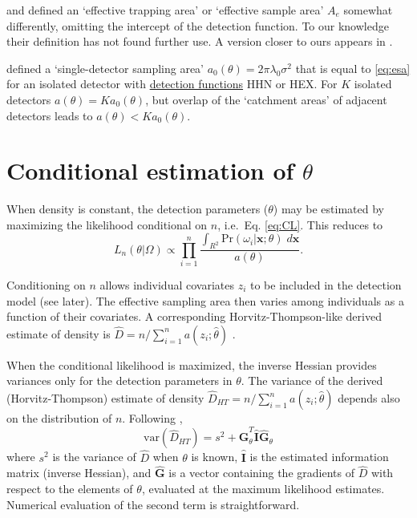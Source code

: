 \documentclass[
]{book}
\begin{document}
\citet{grw09} and \citet{rnug09} defined an `effective trapping area' or `effective sample area' \(A_e\) somewhat differently, omitting the intercept of the detection function. To our knowledge their definition has not found further use. A version closer to ours appears in \citet[Section 5.12]{rcsg14}.

\citet{em14} defined a `single-detector sampling area' \(a_0(\theta) = 2\pi \lambda_0 \sigma^2\) that is equal to \eqref{eq:esa} for an isolated detector with \hyperref[detectfn]{detection functions} HHN or HEX. For \(K\) isolated detectors \(a(\theta) = Ka_0(\theta)\), but overlap of the `catchment areas' of adjacent detectors leads to \(a(\theta) < Ka_0(\theta)\).

\section{\texorpdfstring{Conditional estimation of \(\theta\)}{Conditional estimation of \textbackslash theta}}\label{conditional}


When density is constant, the detection parameters (\(\theta\)) may be estimated by maximizing the likelihood conditional on \(n\), i.e.~Eq. \eqref{eq:CL}. This reduces to\\
\begin{equation}
L_n (\theta| \Omega) \propto \prod_{i=1}^n \frac{\int_{R^2} \mbox{Pr}(\omega_i | \mathbf{x}; \theta) \; d\mathbf{x}}{a(\theta)}.
\end{equation}

Conditioning on \(n\) allows individual covariates \(z_i\) to be included in the detection model (see later). The effective sampling area then varies among individuals as a function of their covariates. A corresponding Horvitz-Thompson-like derived estimate of density is \(\hat D = n / \sum_{i=1}^n a(z_i; \hat \theta)\) \citep{be08}.

When the conditional likelihood is maximized, the inverse Hessian provides variances only for the detection parameters in \(\theta\). The variance of the derived (Horvitz-Thompson) estimate of density \(\hat D_{HT} = n / \sum_{i=1}^n a(z_i; \hat \theta)\) depends also on the distribution of \(n\). Following \citet{h89},
\begin{equation}
\mbox{var}(\hat D_{HT}) = s^2 + \hat {\mathbf{G}}^T_\theta \hat {\mathbf{I}} \hat {\mathbf{G}}_\theta
\label{eq:varHT}
\end{equation}
where \(s^2\) is the variance of \(\hat D\) when \(\theta\) is known, \(\hat {\mathbf{I}}\) is the estimated information matrix (inverse
Hessian), and \(\hat {\mathbf{G}}\) is a vector containing the gradients of \(\hat D\) with respect to the elements
of \(\theta\), evaluated at the maximum likelihood estimates. Numerical evaluation of the second term is straightforward.
\end{document}
